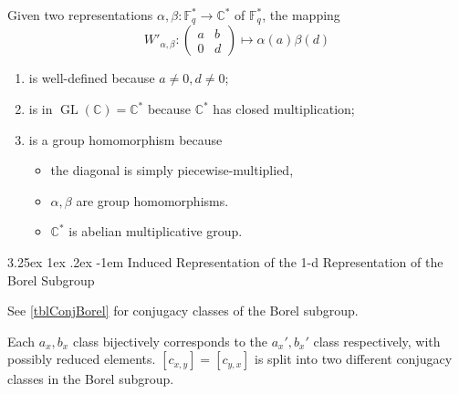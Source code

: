 \documentclass[12pt, letterpaper]{article}
\makeatletter
\newcommand{\co}{\mathbb{C}}
\newcommand{\field}{\mathbb{F}}
\newcommand{\GL}{\operatorname{GL}}
\newcommand{\ec}[1]{\left[{#1}\right]}
\renewcommand\paragraph{\@startsection{paragraph}{4}{\z@}%
	{3.25ex \@plus1ex \@minus.2ex}%
	{-1em}%
	{\normalfont\normalsize\bfseries}}
\theoremstyle{definition}
\theoremstyle{remark}
\theoremstyle{definition}
\theoremstyle{plain}
\numberwithin{equation}{section}
\makeatother
\begin{document}
	Given two representations $\alpha,\beta\colon\field_q^*\to\co^*$ of $\field_q^*$, the mapping
	\[
	W'_{\alpha,\beta}\colon\begin{pmatrix}
		a&b\\0&d
	\end{pmatrix}
	\mapsto
	\alpha(a)\beta(d)
	\]
	\begin{enumerate}
		\item is well-defined because $a\ne0,d\ne0$;
		\item is in $\GL(\co)=\co^*$ because $\co^*$ has closed multiplication;
		\item is a group homomorphism because 
		\begin{itemize}
			\item the diagonal is simply piecewise-multiplied,
			\item $\alpha,\beta$ are group homomorphisms.
			\item $\co^*$ is abelian multiplicative group.
		\end{itemize}
	\end{enumerate}

	\paragraph{Induced Representation of the 1-d Representation of the Borel Subgroup}
	
	See \ref{tblConjBorel} for conjugacy classes of the Borel subgroup.
	
	Each $a_x,b_x$ class bijectively corresponds to the $a_x',b_x'$ class respectively, with possibly reduced elements.
	$\ec{c_{x,y}}=\ec{c_{y,x}}$ is split into two different conjugacy classes in the Borel subgroup.
	
\end{document}

